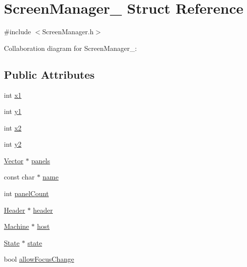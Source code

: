 \hypertarget{structScreenManager__}{}\section{Screen\+Manager\+\_\+ Struct Reference}
\label{structScreenManager__}


{\ttfamily \#include $<$Screen\+Manager.\+h$>$}



Collaboration diagram for Screen\+Manager\+\_\+\+:
\subsection*{Public Attributes}
\begin{DoxyCompactItemize}
\item 
int \hyperlink{structScreenManager___a807d2ce6c597180c605654c1b9f9c569}{x1}
\item 
int \hyperlink{structScreenManager___ab129eae7d398afea29e00a7f936018dc}{y1}
\item 
int \hyperlink{structScreenManager___a89f1be44967b0fc37e8d4f8aeff38a9a}{x2}
\item 
int \hyperlink{structScreenManager___abd39900392527e4f531060d07440a237}{y2}
\item 
\hyperlink{Vector_8h_a8297b82ce917cd21838596b7e3a7faa8}{Vector} $\ast$ \hyperlink{structScreenManager___a2f0eeef0329a05ea2b2bb64875c843f9}{panels}
\item 
const char $\ast$ \hyperlink{structScreenManager___a7fdb184fbc13765bb2bd4f52b9302e27}{name}
\item 
int \hyperlink{structScreenManager___a4d124aef02a3bb16ea69dad676f60373}{panel\+Count}
\item 
\hyperlink{linux_2download_2htop-3_83_80_2Header_8h_a7f4dfcf80c34406946a7bda3d88d5e36}{Header} $\ast$ \hyperlink{structScreenManager___adc57bb02058c063a189b0ae2f8d633dd}{header}
\item 
\hyperlink{Machine_8h_aa3706f95e4706b9d02979efcabb1341d}{Machine} $\ast$ \hyperlink{structScreenManager___ac52efe8c6e97a3815906304502e7334f}{host}
\item 
\hyperlink{Action_8h_a1e6e0d01a9f6c24cd65838caadbf73b2}{State} $\ast$ \hyperlink{structScreenManager___aa90b150d93636a4346d9d118c5886da0}{state}
\item 
bool \hyperlink{structScreenManager___a2da3c9756d5e99f7e0895e2b5e44a789}{allow\+Focus\+Change}
\end{DoxyCompactItemize}


